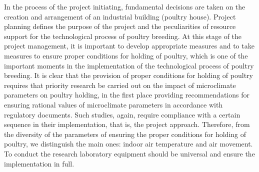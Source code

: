 \documentclass[12pt,twoside]{article}
\begin{document}
\begin{JGGarticle}
			In the process of the project initiating, fundamental decisions are taken on the creation and arrangement of an industrial building (poultry house). Project planning defines the purpose of the project and the peculiarities of resource support for the technological process of poultry breeding. At this stage of the project management, it is important to develop appropriate measures and to take measures to ensure proper conditions for holding of poultry, which is one of the important moments in the implementation of the technological process of poultry breeding. It is clear that the provision of proper conditions for holding of poultry requires that priority research be carried out on the impact of microclimate parameters on poultry holding, in the first place providing recommendations for ensuring rational values of microclimate parameters in accordance with regulatory documents. Such studies, again, require compliance with a certain sequence in their implementation, that is, the project approach. Therefore, from the diversity of the parameters of ensuring the proper conditions for holding of poultry, we distinguish the main ones: indoor air temperature and air movement. To conduct the research laboratory equipment should be universal and ensure the implementation in full.
			

\end{JGGarticle}
\end{document}
